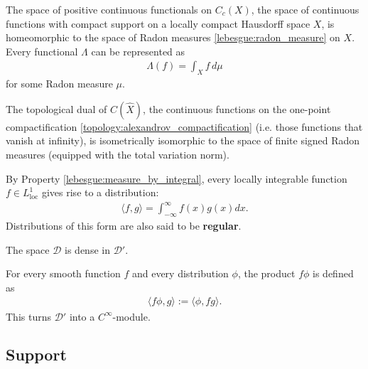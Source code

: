     \begin{theorem}\label{distributions:riesz_markov}
        The space of positive continuous functionals on $C_c(X)$, the space of continuous functions with compact support on a locally compact Hausdorff space $X$, is homeomorphic to the space of Radon measures \ref{lebesgue:radon_measure} on $X$. Every functional $\Lambda$ can be represented as
        \begin{gather}
            \Lambda(f) = \int_Xf\,d\mu
        \end{gather}
        for some Radon measure $\mu$.

        The topological dual of $C(\widehat{X})$, the continuous functions on the one-point compactification \ref{topology:alexandrov_compactification} (i.e. those functions that vanish at infinity), is isometrically isomorphic to the space of finite signed Radon measures (equipped with the total variation norm).
    \end{theorem}

    \begin{example}\label{distributions:ordinary_function}
       	By Property \ref{lebesgue:measure_by_integral}, every locally integrable function $f\in L^1_{\text{loc}}$ gives rise to a distribution:
       	\begin{gather}
   	    	\langle f,g \rangle = \int_{-\infty}^\infty f(x)g(x)dx.
       	\end{gather}
       Distributions of this form are also said to be \textbf{regular}.
   	\end{example}

    \begin{property}
        The space $\mathcal{D}$ is dense in $\mathcal{D}'$.
    \end{property}
    \begin{property}
        For every smooth function $f$ and every distribution $\phi$, the product $f\phi$ is defined as
        \begin{gather}
            \langle f\phi,g \rangle := \langle\phi,fg\rangle.
        \end{gather}
        This turns $\mathcal{D}'$ into a $C^\infty$-module.
    \end{property}

\subsection{Support}

